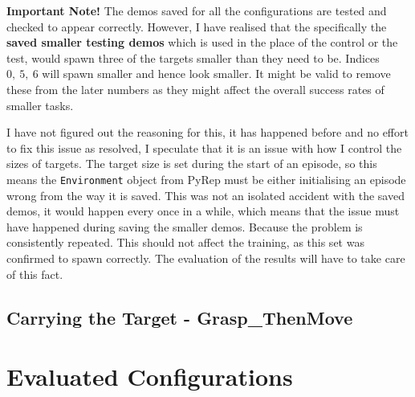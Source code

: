 \textbf{Important Note!}
The demos saved for all the configurations are tested and checked to appear correctly. However, I have realised that the specifically the \textbf{saved smaller testing demos} which is used in the place of the control or the test, would spawn three of the targets smaller than they need to be. Indices  \(0, ~5, ~6\)  will spawn smaller and hence look smaller. It might be valid to remove these from the later numbers as they might affect the overall success rates of smaller tasks. 

I have not figured out the reasoning for this, it has happened before and no effort to fix this issue as resolved, I speculate that it is an issue with how I control the sizes of targets. The target size is set during the start of an episode, so this means the \verb|Environment| object from PyRep must be either initialising an episode wrong from the way it is saved. This was not an isolated accident with the saved demos, it would happen every once in a while, which means that the issue must have happened during saving the smaller demos. Because the problem is consistently repeated. This should not affect the training, as this set was confirmed to spawn correctly. The evaluation of the results will have to take care of this fact.


\subsection{Carrying the Target - \textbf{Grasp\_ThenMove}}

\section{Evaluated Configurations}